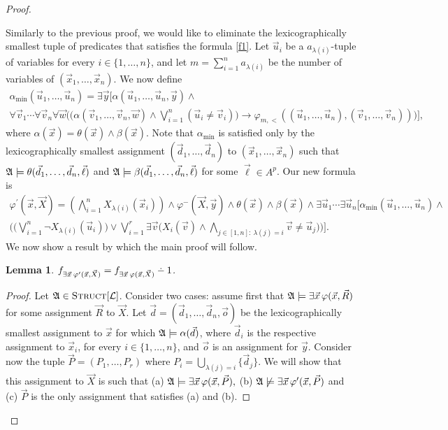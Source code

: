 \documentclass[12pt]{article}
\def\dotminus{\mathbin{\ooalign{\hss\raise1ex\hbox{.}\hss\cr
  \mathsurround=0pt$-$}}}
\def\Truc{\textsc{Struct}[\L]}
\def\A{{\frak A}}
\def\L{{\cal L}}
\def\P{\vec{P}}
\def\R{\vec{R}}
\def\X{\vec{X}}
\def\d{\vec{d}} %
\def\l{\vec{\ell}}
\def\u{\vec{u}} %
\def\v{\vec{v}} %
\def\w{\vec{w}} %
\def\x{\vec{x}} %
\def\y{\vec{y}} %
\def\ep{\vec{o}}
\newtheorem{lemma}[theo]{Lemma}
\begin{document}
\begin{proof}
\begin{enumerate}
Similarly to the previous proof, we would like to eliminate the lexicographically smallest tuple of predicates that satisfies the formula \eqref{f1}. Let $\u_i$ be a $a_{\lambda(i)}$-tuple of variables for every $i \in \{1,\dots,n\}$, and let $m = \sum_{i = 1}^n a_{\lambda(i)}$ be the number of variables of $(\x_1,\dots,\x_n)$. We now define
\begin{multline*}
\alpha_{\min}(\u_1,\dots,\u_n) = \exists\y\Big[ \alpha(\u_1,\dots,\u_n,\y)\wedge \\ \forall\v_1\cdots\forall\v_n\forall\w\Big(\big(\alpha(\v_1,\dots,\v_n,\w)\wedge\bigvee_{i=1}^n(\u_i\neq\v_i)\big)\to \varphi_{m,<}((\u_1,\dots,\u_n),(\v_1,\dots,\v_n))\Big)\Big],
\end{multline*}
where $\alpha(\x) = \theta(\x) \wedge \beta(\x)$. Note that $\alpha_{\min}$ is satisfied only by the lexicographically \linebreak smallest assignment $(\d_1,\dots,\d_n)$ to $(\x_1,\dots,\x_n)$ such that $\A\models\theta(\d_1,\dots,\d_n,\l)$ and $\A\models\beta(\d_1,\dots,\d_n,\l)$ for some $\l \in A^p$. Our new formula is
\begin{multline}
\varphi^\prime(\x,\X) = \left( \bigwedge_{i=1}^n X_{\lambda(i)}(\x_i) \right) \wedge \varphi^{-}(\X,\y) \wedge \theta(\x) \wedge \beta(\x)\wedge\exists\u_1\cdots\exists\u_n\bigg[\alpha_{\min}(\u_1,\dots,\u_n) \wedge \\ \bigg(\bigg(\bigvee_{i = 1}^{n}\neg X_{\lambda(i)}(\u_i) \bigg) \vee \bigvee_{i=1}^r \exists \v\Big( X_i(\v) \wedge \bigwedge_{j\in[1,n]:\: \lambda(j) = i} \v \neq \u_j\Big) \bigg) \bigg] \label{f2}.
\end{multline}
We now show a result by which the main proof will follow.
\begin{lemma}  \label{lemmaone}
$f_{\exists \x \: \varphi^\prime(\x,\X)} = f_{\exists \x \: \varphi(\x,\X)} \dotminus 1$.
\end{lemma}
\begin{proof}
Let $\A \in \Truc$. Consider two cases: assume first that $\A\models\exists\x\,\varphi(\x,\R)$ for some assignment $\R$ to $\X$. Let $\d = (\d_1,\dots,\d_n,\ep)$ be the lexicographically smallest assignment to $\x$ for which $\A\models\alpha(\d)$, where $\d_i$ is the respective assignment to $\x_i$, for every $i\in\{1,\dots,n\}$, and $\ep$ is an assignment for $\y$. Consider now the tuple $\P = (P_1,\dots,P_r)$ where $P_i = \bigcup_{\lambda(j)=i}\{\d_j\}$. We will show that this assignment to $\X$ is such that (a) $\A\models\exists\x\,\varphi(\x,\P),$ (b) $\A\not\models\exists\x\,\varphi^\prime(\x,\P)$ and (c) $\P$ is the only assignment that satisfies (a) and (b).

\end{proof}
\end{enumerate}
\end{proof}
\end{document}

